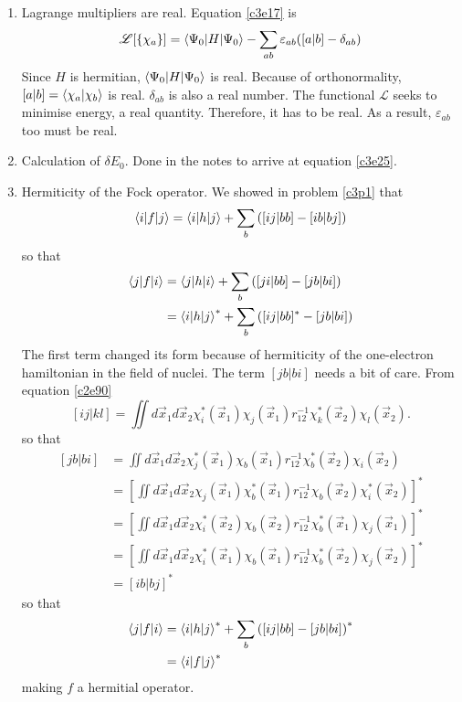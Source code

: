 \begin{enumerate}
\item\label{c3p2} Lagrange multipliers are real.
Equation \eqref{c3e17} is
\[
\mathscr{L}[\{\chi_a\}] = \braket{\Psi_0|H|\Psi_0} - \sum_{ab}\varepsilon_{ab}(
[a|b] - \delta_{ab})
\]
Since $H$ is hermitian, $\braket{\Psi_0|H|\Psi_0}$ is real. Because of 
orthonormality, $[a|b] = \braket{\chi_a|\chi_b}$ is real. $\delta_{ab}$ is also
a real number. The functional $\mathscr{L}$ seeks to minimise energy, a real
quantity. Therefore, it has to be real. As a result, $\varepsilon_{ab}$ too
must be real.

\item\label{c3p3} Calculation of $\delta E_0$.
Done in the notes to arrive at equation \eqref{c3e25}.

\item\label{c3p4} Hermiticity of the Fock operator.
We showed in problem \ref{c3p1} that
\[
\braket{i|f|j} = \braket{i|h|j} + \sum_b\left([ij|bb] - [ib|bj]\right)
\]
so that
\[
\begin{aligned}
\braket{j|f|i} &= \braket{j|h|i} + \sum_b\left([ji|bb] - [jb|bi]\right) \\
 &= \braket{i|h|j}^\ast + \sum_b\left([ij|bb]^\ast - [jb|bi]\right)
\end{aligned}
\]
The first term changed its form because of hermiticity of the one-electron
hamiltonian in the field of nuclei. The term $[jb|bi]$ needs a bit of care. 
From equation \eqref{c2e90}
\[
[ij|kl] = \iint d\vec{x}_1d\vec{x}_2\chi_i^\ast(\vec{x}_1)\chi_j(\vec{x}_1)
r_{12}^{-1}\chi_k^\ast(\vec{x}_2)\chi_l(\vec{x}_2).
\]
so that
\[
\begin{aligned}
[jb|bi] &= \iint d\vec{x}_1d\vec{x}_2\chi_j^\ast(\vec{x}_1)\chi_b(\vec{x}_1)
r_{12}^{-1}\chi_b^\ast(\vec{x}_2)\chi_i(\vec{x}_2) \\
&= \left[\iint d\vec{x}_1d\vec{x}_2\chi_j(\vec{x}_1)\chi_b^\ast(\vec{x}_1)
r_{12}^{-1}\chi_b(\vec{x}_2)\chi_i^\ast(\vec{x}_2) \right]^\ast \\
&= \left[\iint d\vec{x}_1d\vec{x}_2\chi_i^\ast(\vec{x}_2)\chi_b(\vec{x}_2)
r_{12}^{-1}\chi_b^\ast(\vec{x}_1)\chi_j(\vec{x}_1) \right]^\ast \\
&= \left[\iint d\vec{x}_1d\vec{x}_2\chi_i^\ast(\vec{x}_1)\chi_b(\vec{x}_1)
r_{12}^{-1}\chi_b^\ast(\vec{x}_2)\chi_j(\vec{x}_2) \right]^\ast \\
&= [ib|bj]^\ast
\end{aligned}
\]
so that
\[
\begin{aligned}
\braket{j|f|i}&=\braket{i|h|j}^\ast+\sum_b\left([ij|bb] - [jb|bi]\right)^\ast\\
&= \braket{i|f|j}^\ast
\end{aligned}
\]
making $f$ a hermitial operator.


\end{enumerate}
